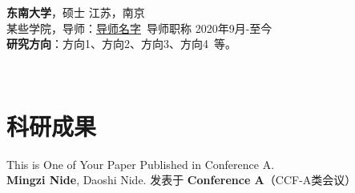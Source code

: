 \documentclass[11pt]{article}
\begin{document}
\begin{minipage}[b]{\textwidth}
\begin{minipage}[t]{0.78\textwidth}
        \vspace{0.5em}
        {\large \textbf{东南大学}}，硕士 \hfill {江苏，南京} \\
        {{某些学院}}，导师：\href{导师的个人主页.site}{导师名字}\ 导师职称 \hfill {2020年9月-至今} \\
        \textbf{研究方向}：方向1、方向2、方向3、方向4\ 等。
    \end{minipage}
    \hfill
    \begin{minipage}[t]{0.2\textwidth}
        \vspace{2em} %
        \setlength{\fboxsep}{0pt}
    \end{minipage}        
    \end{minipage} \ %

    \section{\makebox[\widthof{\faGraduationCap}][c]{\color{primary_color}{\faGraduationCap}}\quad 科研成果}

    This is One of Your Paper Published in Conference A. \\
    \textbf{Mingzi Nide}, Daoshi Nide. \hfill 
    发表于 \textbf{Conference A}（CCF-A类会议） 
\end{document}
